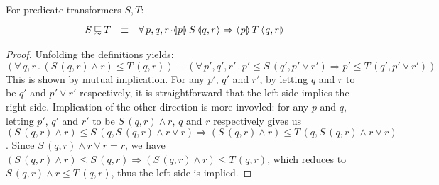 \documentclass[submission,copyright,creativecommons]{eptcs}
\newcommand{\con}{\wedge}
\newcommand{\dis}{\vee}
\newcommand{\imp}{\Rightarrow}
\renewcommand{\dot}{\mathop{.}}
\newcommand{\PARTIAL}[3]{\langle\hspace{-.2em}|#1|\hspace{-.2em}\rangle\,#2\,\langle\hspace{-.2em}|#3|\hspace{-.2em}\rangle}
\newcommand{\prefby}{\mathbin{\raisebox{.15em}{$\sqsubset$}\hspace{-.73em}\raisebox{-.3em}{\small$\sim$}}}
\newcommand{\eq}{\equiv}
\begin{document}
\begin{theorem}
\label{thm:partial_rel}
For predicate transformers $S, T$:
\[\renewcommand{\arraystretch}{1.2}\begin{array}{rcl}
S \prefby T & \eq & \forall\, p, q, r \dot \PARTIAL{p}{S}{q, r} \imp \PARTIAL{p}{T}{q, r}
\end{array}\]
\end{theorem}
\begin{proof}
Unfolding the definitions yields:
\[(\forall\, q, r \dot (S\,(q, r) \con r) \leq T\,(q, r)) \eq (\forall\, p', q', r' \dot p' \leq S\,(q', p' \dis r') \imp p' \leq T\,(q', p' \dis r'))\]
This is shown by mutual implication. For any $p'$, $q'$ and $r'$, by letting $q$ and $r$ to be $q'$ and $p' \dis r'$ respectively, it is straightforward that the left side implies the right side. Implication of the other direction is more invovled: for any $p$ and $q$, letting $p'$, $q'$ and $r'$ to be $S\,(q, r) \con r$, $q$ and $r$ respectively gives us $(S\,(q, r) \con r) \leq S\,(q, S\,(q, r) \con r \dis r) \imp (S\,(q, r) \con r) \leq T\,(q, S\,(q, r) \con r \dis r)$. Since $S\,(q, r) \con r \dis r = r$, we have $(S\,(q, r) \con r) \leq S\,(q, r) \imp (S\,(q, r) \con r) \leq T\,(q, r)$, which reduces to $S\,(q, r) \con r \leq T\,(q, r)$, thus the left side is implied.
\end{proof}
\end{document}
